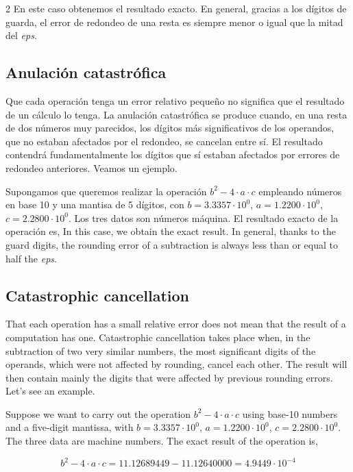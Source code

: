 \begin{paracol}{2}
En este caso obtenemos el resultado exacto. En general, gracias a los dígitos de guarda, el error de redondeo de una resta es siempre menor o igual que la mitad del \emph{eps}.

\subsection{Anulación catastrófica}
Que cada operación tenga un error relativo pequeño no significa que el resultado de un cálculo lo tenga. La anulación catastrófica se produce cuando, en una resta de dos números muy parecidos, los dígitos más significativos de los operandos, que no estaban afectados por el redondeo, se cancelan entre sí. El resultado contendrá fundamentalmente los dígitos que sí estaban afectados por errores de redondeo anteriores. Veamos un ejemplo.

Supongamos que queremos realizar la operación $b^2-4\cdot a \cdot c$ empleando números en base 10 y una mantisa de 5 dígitos, con $b= 3.3357\cdot10^0$, $a=1.2200\cdot10^0$, $c=2.2800\cdot10^0$. Los tres datos son números máquina. El resultado exacto de la operación es,
\switchcolumn
In this case, we obtain the exact result. In general, thanks to the guard digits, the rounding error of a subtraction is always less than or equal to half the \emph{eps}.

\subsection{Catastrophic cancellation}
That each operation has a small relative error does not mean that the result of a computation has one. Catastrophic cancellation takes place when, in the subtraction of two very similar numbers, the most significant digits of the operands, which were not affected by rounding, cancel each other. The result will then contain mainly the digits that were affected by previous rounding errors. Let's see an example.

Suppose we want to carry out the operation $b^2-4\cdot a \cdot c$ using base-10 numbers and a five-digit mantissa, with $b= 3.3357\cdot10^0$, $a=1.2200\cdot10^0$, $c=2.2800\cdot10^0$. The three data are machine numbers. The exact result of the operation is,
\end{paracol}
\begin{equation*}
b^2-4\cdot a\cdot c=11.12689449-11.12640000=4.9449\cdot10^{-4}
\end{equation*}

